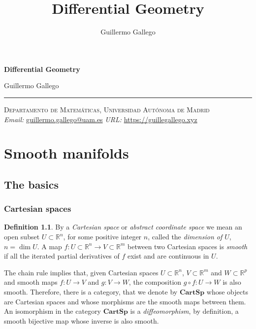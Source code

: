 \documentclass[11pt,a4paper]{book}
\title{Differential Geometry}
\author{Guillermo Gallego}
\theoremstyle{remark} \newtheorem{rmk}[thm]{Remark}
\theoremstyle{definition} \newtheorem{defn}[thm]{Definition}
\theoremstyle{definition} \newtheorem{ex}[thm]{Example}
\theoremstyle{definition} \newtheorem{ej}[thm]{Exercise}
\begin{document}
\begin{titlepage}
\setcounter{page}{1}
\thispagestyle{empty}
\begin{center}
\Large \bfseries Differential Geometry \par\vspace{2em}
\large  Guillermo Gallego \par\bigskip
\end{center}

\vfill
\hrule \vspace{1em}
\begin{center}
\textsc{Departamento de Matemáticas, Universidad Autónoma de Madrid} \\ \vspace{1em}
\textit{Email:} \normalfont\href{mailto:guillermo.gallego@uam.es}{guillermo.gallego@uam.es} \hspace{1em}
\textit{URL:} \normalfont\href{https://guillegallego.xyz}{https://guillegallego.xyz}
\end{center}
\end{titlepage}

\tableofcontents
\chapter{Smooth manifolds}
\section{The basics}
\subsection{Cartesian spaces}
\begin{defn}
By a \emph{Cartesian space} or \emph{abstract coordinate space} we mean an open subset $U\subset \mathbb{R}^n$, for some positive integer $n$, called the \emph{dimension of $U$}, $n=\dim U$. A map $f:U\subset \mathbb{R}^n \rightarrow V \subset \mathbb{R}^m$ between two Cartesian spaces is \emph{smooth} if all the iterated partial derivatives of $f$ exist and are continuous in $U$.
\end{defn}

The chain rule implies that, given Cartesian spaces $U\subset \mathbb{R}^n$, $V\subset \mathbb{R}^m$ and $W\subset \mathbb{R}^p$ and smooth maps $f:U\rightarrow V$ and $g:V\rightarrow W$, the composition $g\circ f:U\rightarrow W$ is also smooth. Therefore, there is a category, that we denote by $\mathbf{CartSp}$ whose objects are Cartesian spaces and whose morphisms are the smooth maps between them. An isomorphism in the category $\mathbf{CartSp}$ is a \emph{diffeomorphism}, by definition, a smooth bijective map whose inverse is also smooth.
\end{document}
